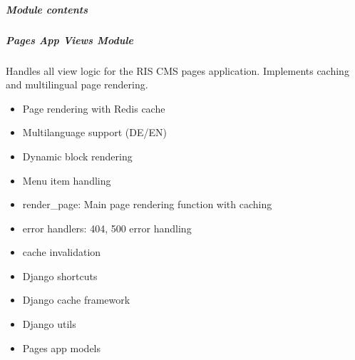 \documentclass[letterpaper,10pt,english]{sphinxmanual}
\begin{document}
\subparagraph{Module contents}
\label{\detokenize{pages_app.views:module-pages_app.views}}\label{\detokenize{pages_app.views:module-contents}}

\subparagraph{Pages App Views Module}
\label{\detokenize{pages_app.views:pages-app-views-module}}
\sphinxAtStartPar
Handles all view logic for the RIS CMS pages application.
Implements caching and multilingual page rendering.
\begin{description}
\begin{itemize}
\item {} 
\sphinxAtStartPar
Page rendering with Redis cache

\item {} 
\sphinxAtStartPar
Multi\sphinxhyphen{}language support (DE/EN)

\item {} 
\sphinxAtStartPar
Dynamic block rendering

\item {} 
\sphinxAtStartPar
Menu item handling

\end{itemize}

\begin{itemize}
\item {} 
\sphinxAtStartPar
render\_page: Main page rendering function with caching

\item {} 
\sphinxAtStartPar
error handlers: 404, 500 error handling

\item {} 
\sphinxAtStartPar
cache invalidation

\end{itemize}

\begin{itemize}
\item {} 
\sphinxAtStartPar
Django shortcuts

\item {} 
\sphinxAtStartPar
Django cache framework

\item {} 
\sphinxAtStartPar
Django utils

\item {} 
\sphinxAtStartPar
Pages app models

\end{itemize}

\end{description}
\end{document}
